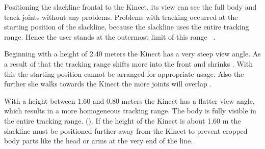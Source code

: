 Positioning the slackline frontal to the Kinect, its view can see the full body and track joints without any problems.
Problems with tracking occurred at the starting position of the slackline, because the slackline uses the entire tracking range. Hence the user stands at the outermost limit of this range ~\textbf{}.

Beginning with a height of 2.40 meters the Kinect has a very steep view angle.
As a result of that the tracking range shifts more into the front and shrinks \textbf{}. With this the starting position cannot be arranged for appropriate usage. 
Also the further she walks towards the Kinect the more joints will overlap .

With a height between 1.60 and 0.80 meters the Kinect has a flatter view angle, which results in a more homogeneous tracking range. The body is fully visible in the entire tracking range. (\textbf{}).
If the height of the Kinect is about 1.60 m the slackline must be positioned further away from the Kinect to prevent cropped body parts like the head or arms at the very end of the line.

